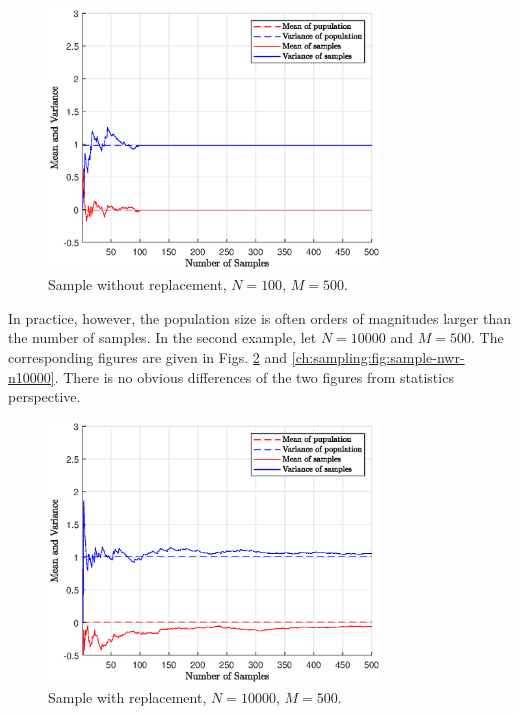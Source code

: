 \begin{figure}
	\centering
	\includegraphics[width=250pt]{chapters/ch-sampling/figures/sample-nwr-n100.eps}
	\caption{Sample without replacement, $N=100$, $M=500$.} \label{ch:sampling:fig:sample-nwr-n100}
\end{figure}

In practice, however, the population size is often orders of magnitudes larger than the number of samples. In the second example, let $N=10000$ and $M=500$. The corresponding figures are given in Figs. \ref{ch:sampling:fig:sample-wr-n10000} and \ref{ch:sampling:fig:sample-nwr-n10000}. There is no obvious differences of the two figures from statistics perspective.

\begin{figure}
	\centering
	\includegraphics[width=250pt]{chapters/ch-sampling/figures/sample-wr-n10000.eps}
	\caption{Sample with replacement, $N=10000$, $M=500$.} \label{ch:sampling:fig:sample-wr-n10000}
\end{figure}

